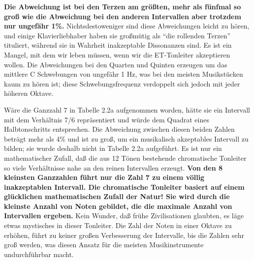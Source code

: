 \textbf{Die Abweichung ist bei den Terzen am größten, mehr als fünfmal so groß wie die Abweichung bei den anderen Intervallen aber trotzdem nur ungefähr 1\%.}
 Nichtsdestoweniger sind diese Abweichungen leicht zu hören, und einige Klavierliebhaber haben sie großmütig als \enquote{die rollenden Terzen} tituliert, während sie in Wahrheit inakzeptable Dissonanzen sind.
 Es ist ein Mangel, mit dem wir leben müssen, wenn wir die ET-Tonleiter akzeptieren wollen.
 Die Abweichungen bei den Quarten und Quinten erzeugen um das mittlere C Schwebungen von ungefähr 1 Hz, was bei den meisten Musikstücken kaum zu hören ist; diese Schwebungsfrequenz verdoppelt sich jedoch mit jeder höheren Oktave.
 

Wäre die Ganzzahl 7 in Tabelle 2.2a aufgenommen worden, hätte sie ein Intervall mit dem Verhältnis 7/6 repräsentiert und würde dem Quadrat eines Halbtonschritts entsprechen.
 Die Abweichung zwischen diesen beiden Zahlen beträgt mehr als 4\% und ist zu groß, um ein musikalisch akzeptables Intervall zu bilden; sie wurde deshalb nicht in Tabelle 2.2a aufgeführt.
 Es ist nur ein mathematischer Zufall, daß die aus 12 Tönen bestehende chromatische Tonleiter so viele Verhältnisse nahe an den reinen Intervallen erzeugt.
 \textbf{Von den 8 kleinsten Ganzzahlen führt nur die Zahl 7 zu einem völlig inakzeptablen Intervall.
 Die chromatische Tonleiter basiert auf einem glücklichen mathematischen Zufall der Natur!
 Sie wird durch die kleinste Anzahl von Noten gebildet, die die maximale Anzahl von Intervallen ergeben.}
 Kein Wunder, daß frühe Zivilisationen glaubten, es läge etwas mystisches in dieser Tonleiter.
 Die Zahl der Noten in einer Oktave zu erhöhen, führt zu keiner großen Verbesserung der Intervalle, bis die Zahlen sehr groß werden, was diesen Ansatz für die meisten Musikinstrumente undurchführbar macht.
 

